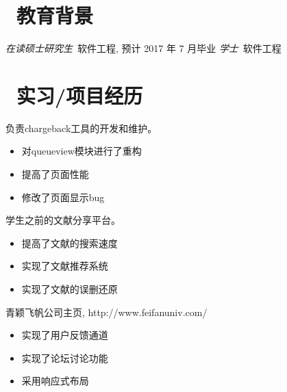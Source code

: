 \documentclass{resume}
\begin{document}



\section{\faGraduationCap\  教育背景}
\textit{在读硕士研究生}\ 软件工程, 预计 2017 年 7 月毕业
\textit{学士}\ 软件工程

\section{\faUsers\ 实习/项目经历}
\role{实习}{软件开发}
负责chargeback工具的开发和维护。
\begin{itemize}
  \item 对queueview模块进行了重构
  \item 提高了页面性能
  \item 修改了页面显示bug
\end{itemize}

\begin{onehalfspacing}
学生之前的文献分享平台。
\begin{itemize}
  \item 提高了文献的搜索速度
  \item 实现了文献推荐系统
  \item 实现了文献的误删还原
\end{itemize}
\end{onehalfspacing}

\begin{onehalfspacing}
青颖飞帆公司主页, http://www.feifanuniv.com/
\begin{itemize}
  \item 实现了用户反馈通道
  \item 实现了论坛讨论功能
  \item 采用响应式布局
\end{itemize}
\end{onehalfspacing}
\end{document}
